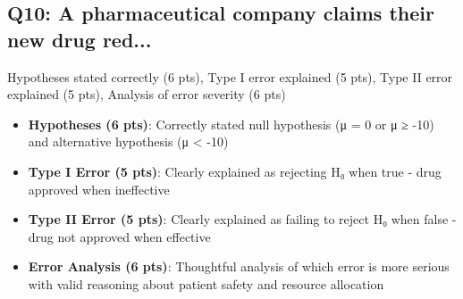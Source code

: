 \documentclass[11pt,letterpaper]{exam}
\begin{document}
\begin{questions}
\subsection*{Q10: A pharmaceutical company claims their new drug red...}

Hypotheses stated correctly (6 pts), Type I error explained (5 pts), Type II error explained (5 pts), Analysis of error severity (6 pts)

\begin{itemize}
  \item \textbf{Hypotheses (6 pts)}: Correctly stated null hypothesis (μ = 0 or μ ≥ -10) and alternative hypothesis (μ < -10)
  \item \textbf{Type I Error (5 pts)}: Clearly explained as rejecting H₀ when true - drug approved when ineffective
  \item \textbf{Type II Error (5 pts)}: Clearly explained as failing to reject H₀ when false - drug not approved when effective
  \item \textbf{Error Analysis (6 pts)}: Thoughtful analysis of which error is more serious with valid reasoning about patient safety and resource allocation
\end{itemize}

\end{questions}
\end{document}
